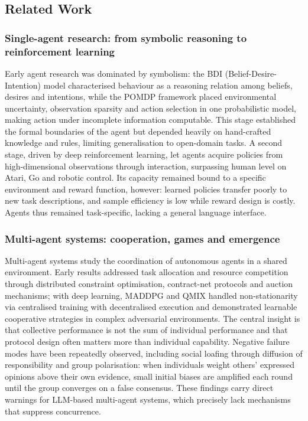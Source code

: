 \documentclass[journal,10pt,a4paper]{IEEEtran}
\begin{document}
\subsection{Related Work}
\subsubsection{Single-agent research: from symbolic reasoning to reinforcement learning}
Early agent research was dominated by symbolism: the BDI (Belief-Desire-Intention) model characterised behaviour as a reasoning relation among beliefs, desires and intentions, while the POMDP framework placed environmental uncertainty, observation sparsity and action selection in one probabilistic model, making action under incomplete information computable. This stage established the formal boundaries of the agent but depended heavily on hand-crafted knowledge and rules, limiting generalisation to open-domain tasks. A second stage, driven by deep reinforcement learning, let agents acquire policies from high-dimensional observations through interaction, surpassing human level on Atari, Go and robotic control. Its capacity remained bound to a specific environment and reward function, however: learned policies transfer poorly to new task descriptions, and sample efficiency is low while reward design is costly. Agents thus remained task-specific, lacking a general language interface.

\subsubsection{Multi-agent systems: cooperation, games and emergence}
Multi-agent systems study the coordination of autonomous agents in a shared environment. Early results addressed task allocation and resource competition through distributed constraint optimisation, contract-net protocols and auction mechanisms; with deep learning, MADDPG and QMIX handled non-stationarity via centralised training with decentralised execution and demonstrated learnable cooperative strategies in complex adversarial environments. The central insight is that collective performance is not the sum of individual performance and that protocol design often matters more than individual capability. Negative failure modes have been repeatedly observed, including social loafing through diffusion of responsibility and group polarisation: when individuals weight others' expressed opinions above their own evidence, small initial biases are amplified each round until the group converges on a false consensus. These findings carry direct warnings for LLM-based multi-agent systems, which precisely lack mechanisms that suppress concurrence.
\end{document}
